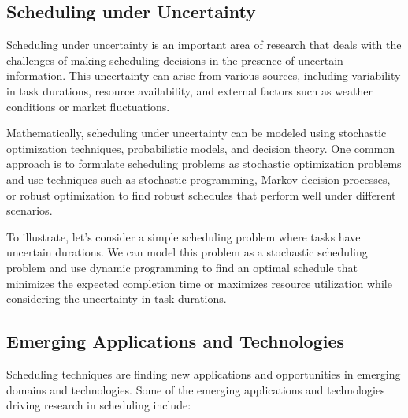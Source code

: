 \documentclass[12pt]{book} %
\begin{document}
\subsection{Scheduling under Uncertainty}

Scheduling under uncertainty is an important area of research that deals with the challenges of making scheduling decisions in the presence of uncertain information. This uncertainty can arise from various sources, including variability in task durations, resource availability, and external factors such as weather conditions or market fluctuations.

Mathematically, scheduling under uncertainty can be modeled using stochastic optimization techniques, probabilistic models, and decision theory. One common approach is to formulate scheduling problems as stochastic optimization problems and use techniques such as stochastic programming, Markov decision processes, or robust optimization to find robust schedules that perform well under different scenarios.

To illustrate, let's consider a simple scheduling problem where tasks have uncertain durations. We can model this problem as a stochastic scheduling problem and use dynamic programming to find an optimal schedule that minimizes the expected completion time or maximizes resource utilization while considering the uncertainty in task durations.

\subsection{Emerging Applications and Technologies}

Scheduling techniques are finding new applications and opportunities in emerging domains and technologies. Some of the emerging applications and technologies driving research in scheduling include:
\end{document}

